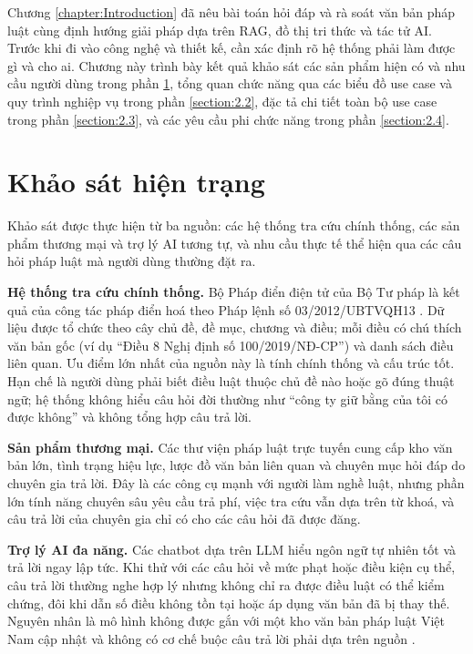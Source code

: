 \documentclass[../DoAn.tex]{subfiles}
\begin{document}
Chương \ref{chapter:Introduction} đã nêu bài toán hỏi đáp và rà soát văn bản pháp luật cùng định hướng giải pháp dựa trên RAG, đồ thị tri thức và tác tử AI. Trước khi đi vào công nghệ và thiết kế, cần xác định rõ hệ thống phải làm được gì và cho ai. Chương này trình bày kết quả khảo sát các sản phẩm hiện có và nhu cầu người dùng trong phần \ref{section:2.1}, tổng quan chức năng qua các biểu đồ use case và quy trình nghiệp vụ trong phần \ref{section:2.2}, đặc tả chi tiết toàn bộ use case trong phần \ref{section:2.3}, và các yêu cầu phi chức năng trong phần \ref{section:2.4}.

\section{Khảo sát hiện trạng}
\label{section:2.1}
Khảo sát được thực hiện từ ba nguồn: các hệ thống tra cứu chính thống, các sản phẩm thương mại và trợ lý AI tương tự, và nhu cầu thực tế thể hiện qua các câu hỏi pháp luật mà người dùng thường đặt ra.

\textbf{Hệ thống tra cứu chính thống.} Bộ Pháp điển điện tử của Bộ Tư pháp \cite{phapdienportal} là kết quả của công tác pháp điển hoá theo Pháp lệnh số 03/2012/UBTVQH13 \cite{plpd2012}. Dữ liệu được tổ chức theo cây chủ đề, đề mục, chương và điều; mỗi điều có chú thích văn bản gốc (ví dụ ``Điều 8 Nghị định số 100/2019/NĐ-CP'') và danh sách điều liên quan. Ưu điểm lớn nhất của nguồn này là tính chính thống và cấu trúc tốt. Hạn chế là người dùng phải biết điều luật thuộc chủ đề nào hoặc gõ đúng thuật ngữ; hệ thống không hiểu câu hỏi đời thường như ``công ty giữ bằng của tôi có được không'' và không tổng hợp câu trả lời.

\textbf{Sản phẩm thương mại.} Các thư viện pháp luật trực tuyến cung cấp kho văn bản lớn, tình trạng hiệu lực, lược đồ văn bản liên quan và chuyên mục hỏi đáp do chuyên gia trả lời. Đây là các công cụ mạnh với người làm nghề luật, nhưng phần lớn tính năng chuyên sâu yêu cầu trả phí, việc tra cứu vẫn dựa trên từ khoá, và câu trả lời của chuyên gia chỉ có cho các câu hỏi đã được đăng.

\textbf{Trợ lý AI đa năng.} Các chatbot dựa trên LLM hiểu ngôn ngữ tự nhiên tốt và trả lời ngay lập tức. Khi thử với các câu hỏi về mức phạt hoặc điều kiện cụ thể, câu trả lời thường nghe hợp lý nhưng không chỉ ra được điều luật có thể kiểm chứng, đôi khi dẫn số điều không tồn tại hoặc áp dụng văn bản đã bị thay thế. Nguyên nhân là mô hình không được gắn với một kho văn bản pháp luật Việt Nam cập nhật và không có cơ chế buộc câu trả lời phải dựa trên nguồn \cite{ji2023hallucination}.
\end{document}
